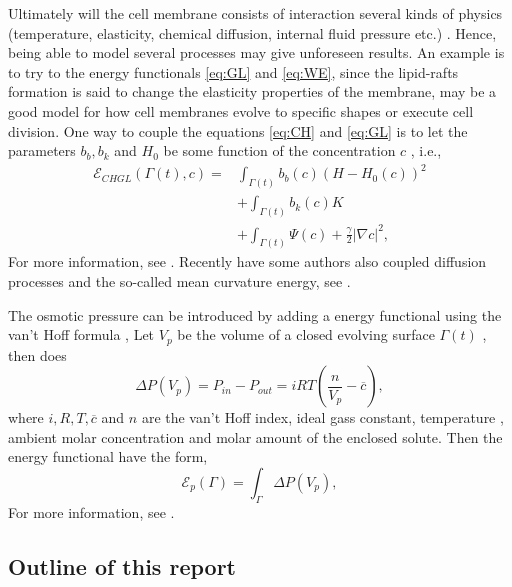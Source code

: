 Ultimately will the cell membrane consists of interaction several kinds of physics (temperature, elasticity, chemical diffusion, internal fluid pressure etc.) \cite{udo97}. Hence, being able to model several processes may give unforeseen results. An example is to try to the
energy functionals \eqref{eq:GL}  and \eqref{eq:WE}, since the lipid-rafts formation is said to change the elasticity properties of the membrane, may be a good model for how cell membranes evolve to specific shapes or execute cell division. One way
to couple the equations \eqref{eq:CH} and \eqref{eq:GL} is to let the parameters $b_{b}, b_{k}$ and $ H_{0} $ be some function of the concentration $c$ , i.e.,
\[
    \begin{split}
        \mathcal{E}_{CHGL} \left( \Gamma\left( t \right) ,c   \right) =  & \int_{\Gamma\left( t \right)  }^{}  b_{b}\left( c \right)  \left( H- H_{0}\left( c \right)  \right) ^{2}  \\
        & + \int_{\Gamma\left(t  \right)   }^{} b_{k}\left( c \right)  K \\
        &+ \int_{\Gamma\left(t  \right)   }^{}\Psi \left( c \right) + \frac{\gamma}{2} \left\lvert \nabla c \right\rvert^{2} ,
    \end{split}
\]
For more information, see \cite{elliott2010surface}. Recently have some authors also coupled diffusion processes and the so-called mean curvature energy, see \cite{burger2021interaction, elliott2022numerical}.




The osmotic pressure can be introduced by adding a energy functional using the van't Hoff formula ,
Let $V_{p}$ be the volume of a closed evolving surface $\Gamma \left( t \right) $ ,  then does
\[
\Delta P \left( V_{p} \right) = P_{in} - P_{out} = iRT\left( \frac{n}{V_{p}} - \overline{c}  \right),
\]
where $i, R, T, \overline{c} $ and $n$ are the van't Hoff index, ideal gass constant, temperature , ambient molar concentration and molar amount of the enclosed solute. Then the energy
functional have the form,
\[
\mathcal{E} _{p}\left( \Gamma    \right)  = \int_{\Gamma   }^{   } \Delta P\left( V_{p} \right) ,
\]
For more information, see \cite{zhu2022mem3dg}.


\subsection{Outline of this report}%
\label{sub:outline_of_this_report}

